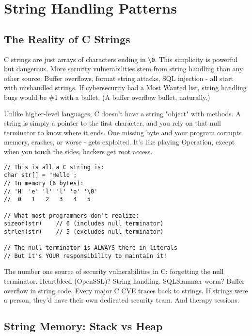 \chapter{String Handling Patterns}

\section{The Reality of C Strings}

C strings are just arrays of characters ending in \texttt{\textbackslash 0}. This simplicity is powerful but dangerous. More security vulnerabilities stem from string handling than any other source. Buffer overflows, format string attacks, SQL injection - all start with mishandled strings. If cybersecurity had a Most Wanted list, string handling bugs would be \#1 with a bullet. (A buffer overflow bullet, naturally.)

Unlike higher-level languages, C doesn't have a string "object" with methods. A string is simply a pointer to the first character, and you rely on that null terminator to know where it ends. One missing byte and your program corrupts memory, crashes, or worse - gets exploited. It's like playing Operation, except when you touch the sides, hackers get root access.

\begin{lstlisting}
// This is all a C string is:
char str[] = "Hello";
// In memory (6 bytes):
// 'H' 'e' 'l' 'l' 'o' '\0'
//  0   1   2   3   4   5

// What most programmers don't realize:
sizeof(str)    // 6 (includes null terminator)
strlen(str)    // 5 (excludes null terminator)

// The null terminator is ALWAYS there in literals
// But it's YOUR responsibility to maintain it!
\end{lstlisting}

\begin{warningbox}
The number one source of security vulnerabilities in C: forgetting the null terminator. Heartbleed (OpenSSL)? String handling. SQLSlammer worm? Buffer overflow in string code. Every major C CVE traces back to strings. If strings were a person, they'd have their own dedicated security team. And therapy sessions.
\end{warningbox}

\section{String Memory: Stack vs Heap}

